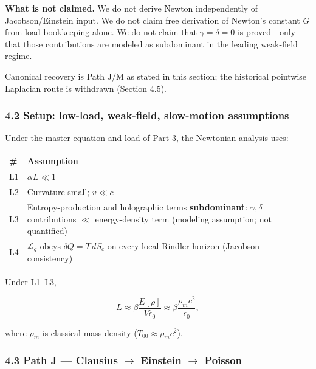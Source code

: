 \documentclass[
  11pt,
]{article}
\newcounter{none} %
\begin{document}
\textbf{What is not claimed.} We do not derive Newton independently of
Jacobson/Einstein input. We do not claim free derivation of Newton's
constant \(G\) from load bookkeeping alone. We do not claim that
\(\gamma=\delta=0\) is proved---only that those contributions are
modeled as subdominant in the leading weak-field regime.

Canonical recovery is Path J/M as stated in this section; the historical
pointwise Laplacian route is withdrawn (Section 4.5).

\subsubsection{4.2 Setup: low-load, weak-field, slow-motion
assumptions}\label{setup-low-load-weak-field-slow-motion-assumptions}

Under the master equation and load of Part 3, the Newtonian analysis
uses:

{\def\LTcaptype{none} %
\begin{longtable}[]{@{}
  >{\raggedright\arraybackslash}p{}
  >{\raggedright\arraybackslash}p{}@{}}
\toprule\noalign{}
\begin{minipage}[b]{\linewidth}\raggedright
\#
\end{minipage} & \begin{minipage}[b]{\linewidth}\raggedright
Assumption
\end{minipage} \\
\midrule\noalign{}
\endhead
\bottomrule\noalign{}
\endlastfoot
L1 & \(\alpha L\ll 1\) \\
L2 & Curvature small; \(v\ll c\) \\
L3 & Entropy-production and holographic terms \textbf{subdominant}:
\(\gamma,\delta\) contributions \(\ll\) energy-density term (modeling
assumption; not quantified) \\
L4 & \(\mathcal{L}_g\) obeys \(\delta Q=T\,dS_c\) on every local Rindler
horizon (Jacobson consistency) \\
\end{longtable}
}

Under L1--L3,

\[
L
\approx
\beta\frac{E[\rho]}{V\epsilon_0}
\approx
\beta\frac{\rho_m c^2}{\epsilon_0},
\]

where \(\rho_m\) is classical mass density
(\(T_{00}\approx\rho_m c^2\)).

\subsubsection{4.3 Path J --- Clausius $\to$ Einstein $\to$
Poisson}\label{path-j-clausius-einstein-poisson}
\end{document}
